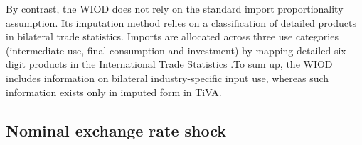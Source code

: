 \documentclass[11pt,a4paper]{article}
\begin{document}
By contrast, the WIOD does not rely on the standard import proportionality assumption. 
Its imputation method relies on a classification of detailed products in bilateral trade statistics.
Imports are allocated across three use categories (intermediate use, final consumption and investment) by mapping detailed six-digit products in the International Trade Statistics \citep{Dietzenbacher2013}.To sum up, the WIOD includes information on bilateral industry-specific input use, whereas such information exists only in imputed form in TiVA. 


\subsection{Nominal exchange rate shock} \label{subsec:chocchange}
\end{document}
